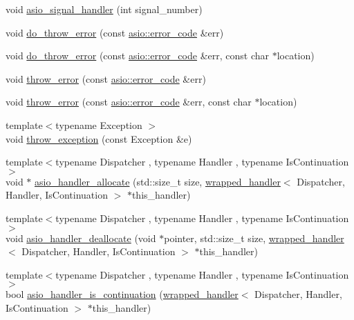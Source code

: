 \begin{DoxyCompactItemize}
\item 
void \hyperlink{namespaceasio_1_1detail_a689927725337c59f64507928c894944c}{asio\+\_\+signal\+\_\+handler} (int signal\+\_\+number)
\item 
void \hyperlink{namespaceasio_1_1detail_ab9418bf2d1d8373eb96b01633bab1af3}{do\+\_\+throw\+\_\+error} (const \hyperlink{classasio_1_1error__code}{asio\+::error\+\_\+code} \&err)
\item 
void \hyperlink{namespaceasio_1_1detail_aeee91fb7f86bb34dce4e56b59f52241a}{do\+\_\+throw\+\_\+error} (const \hyperlink{classasio_1_1error__code}{asio\+::error\+\_\+code} \&err, const char $\ast$location)
\item 
void \hyperlink{namespaceasio_1_1detail_af2f9dc57e3478f17895a9846b5fd1626}{throw\+\_\+error} (const \hyperlink{classasio_1_1error__code}{asio\+::error\+\_\+code} \&err)
\item 
void \hyperlink{namespaceasio_1_1detail_aaaf949031e25f3e993943a512dd6a106}{throw\+\_\+error} (const \hyperlink{classasio_1_1error__code}{asio\+::error\+\_\+code} \&err, const char $\ast$location)
\item 
{\footnotesize template$<$typename Exception $>$ }\\void \hyperlink{namespaceasio_1_1detail_ab397b53a310cfe1f43a9d87809e24321}{throw\+\_\+exception} (const Exception \&e)
\item 
{\footnotesize template$<$typename Dispatcher , typename Handler , typename Is\+Continuation $>$ }\\void $\ast$ \hyperlink{namespaceasio_1_1detail_a6e88b1f434e35c1c949adc95206d14ba}{asio\+\_\+handler\+\_\+allocate} (std\+::size\+\_\+t size, \hyperlink{classasio_1_1detail_1_1wrapped__handler}{wrapped\+\_\+handler}$<$ Dispatcher, Handler, Is\+Continuation $>$ $\ast$this\+\_\+handler)
\item 
{\footnotesize template$<$typename Dispatcher , typename Handler , typename Is\+Continuation $>$ }\\void \hyperlink{namespaceasio_1_1detail_a1d4466a39f39cb662372dcdbfe9cea2b}{asio\+\_\+handler\+\_\+deallocate} (void $\ast$pointer, std\+::size\+\_\+t size, \hyperlink{classasio_1_1detail_1_1wrapped__handler}{wrapped\+\_\+handler}$<$ Dispatcher, Handler, Is\+Continuation $>$ $\ast$this\+\_\+handler)
\item 
{\footnotesize template$<$typename Dispatcher , typename Handler , typename Is\+Continuation $>$ }\\bool \hyperlink{namespaceasio_1_1detail_aa7dc154cb472c6cac1258a45c494da66}{asio\+\_\+handler\+\_\+is\+\_\+continuation} (\hyperlink{classasio_1_1detail_1_1wrapped__handler}{wrapped\+\_\+handler}$<$ Dispatcher, Handler, Is\+Continuation $>$ $\ast$this\+\_\+handler)

\end{DoxyCompactItemize}
